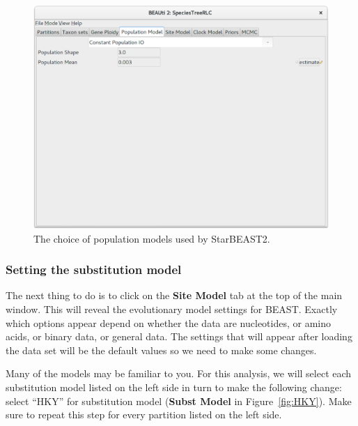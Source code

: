 \documentclass{article}
\begin{document}
\begin{figure}[htb!]
\centering
\includegraphics[width=\textwidth]{figures/beauti-pop-model.png}
\caption{The choice of population models used by StarBEAST2.}
\label{fig:pop}
\end{figure}

\clearpage

\subsubsection*{Setting the substitution model}

The next thing to do is to click on the \textbf{Site Model} tab at the top of
the main window. This will reveal the evolutionary model settings for BEAST.
Exactly which options appear depend on whether the data are nucleotides, or
amino acids, or binary data, or general data. The settings that will appear
after loading the data set will be the default values so we need to make some
changes.

Many of the models may be familiar to you. For this analysis, we will select
each substitution model listed on the left side in turn to make the following
change: select ``HKY'' for substitution model (\textbf{Subst Model} in
Figure~\ref{fig:HKY}). Make sure to repeat this step for every partition listed
on the left side.
\end{document}
